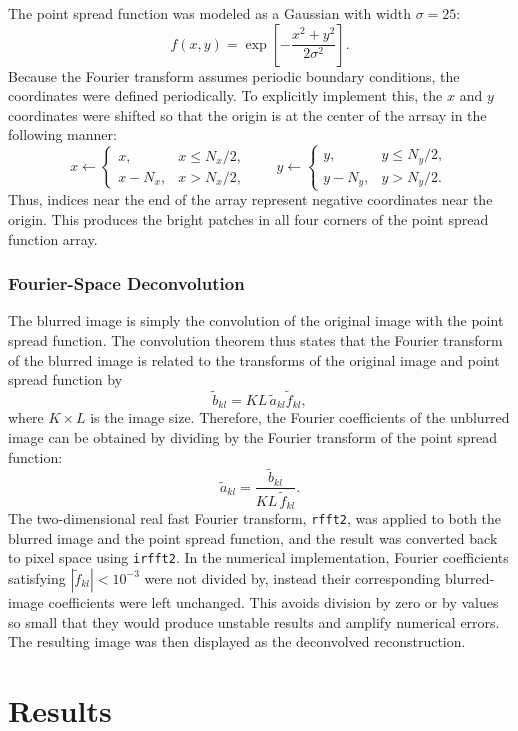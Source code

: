 \documentclass[a4paper,11pt]{article}
\begin{document}
The point spread function was modeled as a Gaussian with width
$\sigma=25$: \[f(x,y) = \exp\left[ -\frac{x^2+y^2}{2\sigma^2}\right].\]
Because the Fourier transform assumes periodic boundary conditions, the coordinates were defined periodically. To explicitly implement this, the $x$ and $y$ coordinates were shifted so that the origin is at the center of the arrsay in the following manner:
\[x \leftarrow \begin{cases} x, & x \leq N_x/2,\\ x-N_x, & x>N_x/2, \end{cases} \qquad y \leftarrow \begin{cases} y, & y \leq N_y/2,\\ y-N_y, & y>N_y/2. \end{cases}\]
Thus, indices near the end of the array represent negative coordinates near the origin. This produces the bright patches in all four corners of the point spread function array.

\subsubsection*{Fourier-Space Deconvolution}

The blurred image is simply the convolution of the original image with the point spread function. The convolution theorem thus states that the Fourier transform of the blurred image is related to the transforms of the original image and point spread function by
\[\widetilde{b}_{kl} = KL\,\widetilde{a}_{kl}\widetilde{f}_{kl},\] where $K\times L$ is the image size. Therefore, the Fourier coefficients of the unblurred image can be obtained by dividing by the Fourier transform of the point spread function:
\[\widetilde{a}_{kl} = \frac{\widetilde{b}_{kl}}{KL\,\widetilde{f}_{kl}}.\]
The two-dimensional real fast Fourier transform, \texttt{rfft2}, was applied to both the blurred image and the point spread function, and the result was converted back to pixel space using \texttt{irfft2}. In the numerical implementation, Fourier coefficients satisfying $|\widetilde{f}_{kl}|<10^{-3}$ were not divided by, instead their corresponding blurred-image coefficients were left unchanged. This avoids division by zero or by values so small that they would produce unstable results and amplify numerical errors. The resulting image was then displayed as the deconvolved reconstruction.

\section*{Results}
\end{document}
